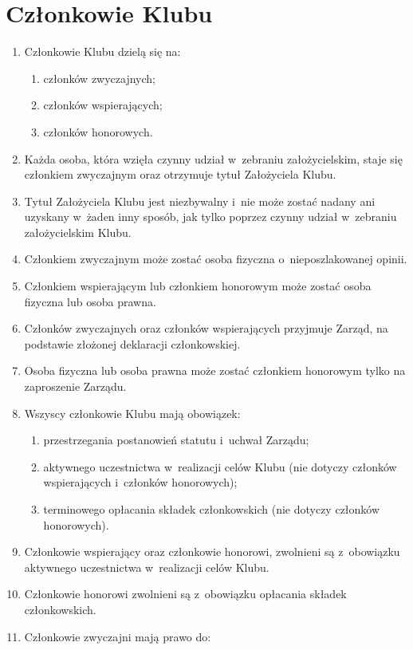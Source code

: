 \section{Członkowie Klubu}
\begin{enumerate}
    \item Członkowie Klubu dzielą się na:
    \begin{enumerate}
        \item członków zwyczajnych;
        \item członków wspierających;
        \item członków honorowych.
    \end{enumerate}
    \item Każda osoba, która wzięła czynny udział w~zebraniu założycielskim, staje się członkiem zwyczajnym oraz otrzymuje tytuł Założyciela Klubu.
    \item Tytuł Założyciela Klubu jest niezbywalny i~nie może zostać nadany ani uzyskany w~żaden inny sposób, jak tylko poprzez czynny udział w~zebraniu założycielskim Klubu.
    \item Członkiem zwyczajnym może zostać osoba fizyczna o~nieposzlakowanej opinii.
    \item Członkiem wspierającym lub członkiem honorowym może zostać osoba fizyczna lub osoba prawna.
    \item Członków zwyczajnych oraz członków wspierających przyjmuje Zarząd, na podstawie złożonej deklaracji członkowskiej.
    \item Osoba fizyczna lub osoba prawna może zostać członkiem honorowym tylko na zaproszenie Zarządu.
    \item Wszyscy członkowie Klubu mają obowiązek:
    \begin{enumerate}
        \item przestrzegania postanowień statutu i~uchwał Zarządu;
        \item aktywnego uczestnictwa w~realizacji celów Klubu (nie dotyczy członków wspierających i~członków honorowych);
        \item terminowego opłacania składek członkowskich (nie dotyczy członków honorowych).
    \end{enumerate}
    \item Członkowie wspierający oraz członkowie honorowi, zwolnieni są z~obowiązku aktywnego uczestnictwa w~realizacji celów Klubu.
    \item Członkowie honorowi zwolnieni są z~obowiązku opłacania składek członkowskich.
    \item Członkowie zwyczajni mają prawo do:

\end{enumerate}
